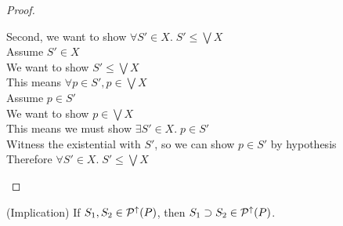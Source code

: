 \begin{proof}
\begin{tabbedproof}
\ooo Second, we want to show $\forall S' \in X.\; S' \leq \bigvee X$ \\
\oooo Assume $S' \in X$ \\
\ooooo We want to show $S' \leq \bigvee X$ \\
\ooooo This means $\forall p \in S', p \in \bigvee X$ \\
\ooooo Assume $p \in S'$ \\
\oooooo We want to show $p \in \bigvee X$ \\
\oooooo This means we must show $\exists S' \in X.\; p \in S'$ \\
\oooooo Witness the existential with $S'$, so we can show $p \in S'$ by hypothesis \\
\oooo  Therefore $\forall S' \in X.\; S' \leq \bigvee X$ \\
\end{tabbedproof}
\end{proof}




\begin{lemma}{(Implication)}
If $S_1, S_2 \in \mathcal{P}^{\uparrow}({P})$, then
$S_1 \supset S_2 \in \mathcal{P}^{\uparrow}({P})$. 
\end{lemma}

